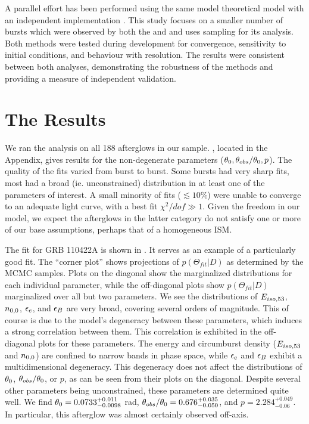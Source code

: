 A parallel effort has been performed using the same model theoretical model with an independent implementation \citep{Zhang15}.  This study focuses on a smaller number of bursts which were observed by both the \swiftXRT{} and \chandra{} and uses \multinest{} sampling for its analysis.  Both methods were tested during development for convergence, sensitivity to initial conditions, and behaviour with resolution.  The results were consistent between both analyses, demonstrating the robustness of the methods and providing a measure of independent validation.


\section{The Results}

We ran the \scalefit{} analysis on all 188 afterglows in our sample.  , located in the Appendix, gives results for the non-degenerate parameters ($\theta_0, \theta_{obs}/\theta_0, p$).  The quality of the fits varied from burst to burst.  Some bursts had very sharp fits, most had a broad (ie. unconstrained) distribution in at least one of the parameters of interest.  A small minority of fits ($\lesssim10\%$) were unable to converge to an adequate light curve, with a best fit $\chi^2/dof \gg 1$.  Given the freedom in our model, we expect the afterglows in the latter category do not satisfy one or more of our base assumptions, perhaps that of a homogeneous ISM.

The fit for GRB 110422A is shown in . It serves as an example of a particularly good fit.  The ``corner plot'' shows projections of $p(\Theta_{fit} | D)$ as determined by the MCMC samples.  Plots on the diagonal show the marginalized distributions for each individual parameter, while the off-diagonal plots show $p(\Theta_{fit} | D)$ marginalized over all but two parameters.  We see the distributions of $E_{iso, 53}$, $n_{0, 0}$, $\epsilon_e$, and $\epsilon_B$ are very broad, covering several orders of magnitude.  This of course is due to the model's degeneracy between these parameters, which induces a strong correlation between them. This correlation is exhibited in the off-diagonal plots for these parameters.  The energy and circumburst density ($E_{iso, 53}$ and $n_{0, 0}$) are confined to narrow bands in phase space, while $\epsilon_e$ and $\epsilon_B$ exhibit a multidimensional degeneracy.  This degeneracy does not affect the distributions of $\theta_0$, $\theta_{obs}/\theta_0$, or $p$, as can be seen from their plots on the diagonal.  Despite several other parameters being unconstrained, these parameters are determined quite well.  We find $\theta_0 = 0.0733^{+0.011}_{-0.0098}$ rad, $\theta_{obs}/\theta_0 = 0.676^{+0.035}_{-0.050}$, and $p=2.284^{+0.049}_{-0.06}$.  In particular, this afterglow was almost certainly observed off-axis.


